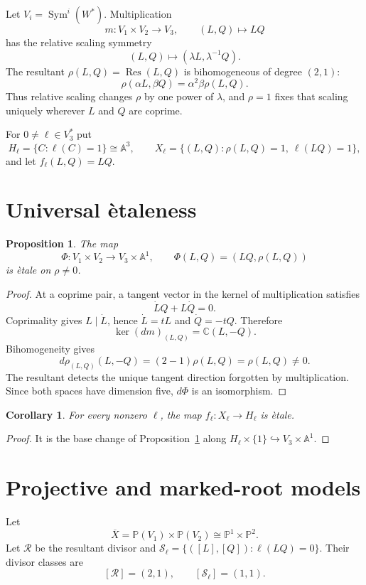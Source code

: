 \documentclass[11pt]{article}
\newcommand{\A}{\mathbb A}
\newcommand{\C}{\mathbb C}
\newcommand{\Pj}{\mathbb P}
\newcommand{\Res}{\operatorname{Res}}
\newcommand{\Sym}{\operatorname{Sym}}
\newtheorem{proposition}[theorem]{Proposition}
\newtheorem{corollary}[theorem]{Corollary}
\theoremstyle{remark}
\begin{document}
Let $V_i=\Sym^i(W^*)$. Multiplication
\[
m:V_1\times V_2\to V_3,\qquad (L,Q)\mapsto LQ
\]
has the relative scaling symmetry
\[
(L,Q)\mapsto(\lambda L,\lambda^{-1}Q).
\]
The resultant $\rho(L,Q)=\Res(L,Q)$ is bihomogeneous of degree $(2,1)$:
\[
\rho(\alpha L,\beta Q)=\alpha^2\beta\rho(L,Q).
\]
Thus relative scaling changes $\rho$ by one power of $\lambda$, and $\rho=1$
fixes that scaling uniquely wherever $L$ and $Q$ are coprime.

For $0\ne\ell\in V_3^*$ put
\[
H_\ell=\{C:\ell(C)=1\}\cong\A^3,
\qquad
X_\ell=\{(L,Q):\rho(L,Q)=1,\ \ell(LQ)=1\},
\]
and let $f_\ell(L,Q)=LQ$.

\section{Universal \`etaleness}

\begin{proposition}\label{prop:universal-etale}
The map
\[
\Phi:V_1\times V_2\longrightarrow V_3\times\A^1,
\qquad \Phi(L,Q)=(LQ,\rho(L,Q))
\]
is \`etale on $\rho\ne0$.
\end{proposition}

\begin{proof}
At a coprime pair, a tangent vector in the kernel of multiplication satisfies
\[
\dot LQ+L\dot Q=0.
\]
Coprimality gives $L\mid\dot L$, hence $\dot L=tL$ and $\dot Q=-tQ$.
Therefore
\[
\ker(dm)_{(L,Q)}=\C(L,-Q).
\]
Bihomogeneity gives
\[
d\rho_{(L,Q)}(L,-Q)=(2-1)\rho(L,Q)=\rho(L,Q)\ne0.
\]
The resultant detects the unique tangent direction forgotten by
multiplication. Since both spaces have dimension five, $d\Phi$ is an
isomorphism.
\end{proof}

\begin{corollary}\label{cor:slice-etale}
For every nonzero $\ell$, the map $f_\ell:X_\ell\to H_\ell$ is \`etale.
\end{corollary}

\begin{proof}
It is the base change of Proposition~\ref{prop:universal-etale} along
$H_\ell\times\{1\}\hookrightarrow V_3\times\A^1$.
\end{proof}

\section{Projective and marked-root models}

Let
\[
\overline X=\Pj(V_1)\times\Pj(V_2)\cong\Pj^1\times\Pj^2.
\]
Let $\mathcal R$ be the resultant divisor and
$\mathcal S_\ell=\{([L],[Q]):\ell(LQ)=0\}$. Their divisor classes are
\[
[\mathcal R]=(2,1),\qquad[\mathcal S_\ell]=(1,1).
\]
\end{document}
